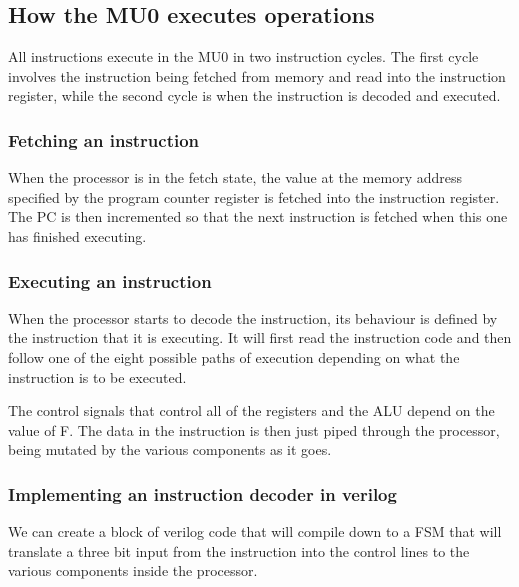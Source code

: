 \subsection{How the MU0 executes operations}

All instructions execute in the MU0 in two instruction cycles. The first cycle
involves the instruction being fetched from memory and read into the instruction
register, while the second cycle is when the instruction is decoded and
executed.

\subsubsection{Fetching an instruction}

When the processor is in the fetch state, the value at the memory address
specified by the program counter register is fetched into the instruction
register. The PC is then incremented so that the next instruction is fetched
when this one has finished executing.


\subsubsection{Executing an instruction}

When the processor starts to decode the instruction, its behaviour is defined by
the instruction that it is executing. It will first read the instruction code
and then follow one of the eight possible paths of execution depending on what
the instruction is to be executed.

The control signals that control all of the registers and the ALU depend on the
value of F. The data in the instruction is then just piped through the
processor, being mutated by the various components as it goes.

\subsubsection{Implementing an instruction decoder in verilog}

We can create a block of verilog code that will compile down to a FSM that will
translate a three bit input from the instruction into the control lines to the
various components inside the processor.

